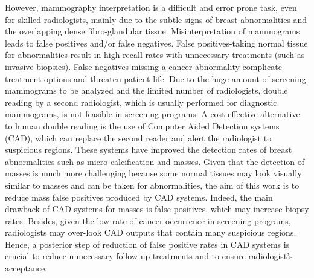 \documentclass[review,12pt]{elsarticle}
\begin{document}
However, mammography interpretation is a difficult and error prone task, even for skilled radiologists, mainly due to the subtle signs of breast abnormalities and the overlapping dense fibro-glandular tissue. Misinterpretation of mammograms leads to false positives and/or false negatives. False positives-taking normal tissue for abnormalities-result in high recall rates with unnecessary treatments (such as invasive biopsies). False negatives-missing a cancer abnormality-complicate treatment options and threaten patient life. Due to the huge amount of screening mammograms to be analyzed and the limited number of radiologists, double reading by a second radiologist, which is usually performed for diagnostic mammograms, is not feasible in screening programs. A cost-effective alternative to human double reading is the use of Computer Aided Detection systems (CAD), which can replace the second reader and alert the radiologist to suspicious regions. These systems have improved the detection rates of breast abnormalities such as micro-calcification and masses. Given that the detection of masses is much more challenging because some normal tissues may look visually similar to masses and can be taken for abnormalities, the aim of this work is to reduce mass false positives produced by CAD systems. Indeed, the main drawback of CAD systems for masses is false positives, which may increase biopsy rates. Besides, given the low rate of cancer occurrence in screening programs, radiologists may over-look CAD outputs that contain many suspicious regions.  Hence, a posterior step of reduction of false positive rates in CAD systems is crucial to reduce unnecessary follow-up treatments and to ensure radiologist’s acceptance.
\end{document}
